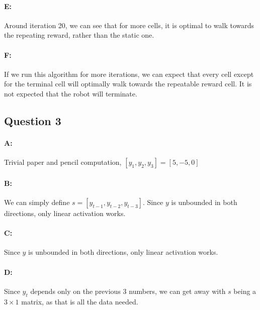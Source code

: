 \documentclass{article}
\begin{document}
\paragraph{E: } Around iteration 20, we can see that for more cells, it is optimal to walk towards the repeating reward, rather than the static one.

\paragraph{F: } If we run this algorithm for more iterations, we can expect that every cell except for the terminal cell will optimally walk towards the repeatable reward cell. It is not expected that the robot will terminate.

\subsection{Question 3}

\paragraph{A: } Trivial paper and pencil computation, $[y_1, y_2, y_3]=[5, -5, 0]$

\paragraph{B: } We can simply define $s=[y_{t-1}, y_{t-2}, y_{t-3}]$. Since $y$ is unbounded in both directions, only linear activation works.

\paragraph{C: } Since $y$ is unbounded in both directions, only linear activation works.

\paragraph{D: } Since $y_t$ depends only on the previous $3$ numbers, we can get away with $s$ being a $3\times 1$ matrix, as that is all the data needed.
\end{document}
